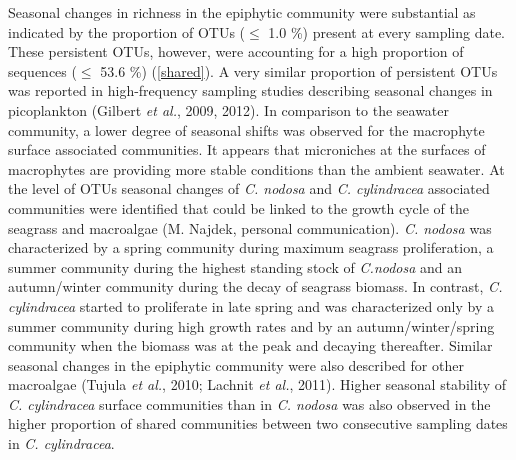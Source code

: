 \documentclass[12pt,]{article}
\begin{document}
Seasonal changes in richness in the epiphytic community were substantial
as indicated by the proportion of OTUs (\(\leq\) 1.0 \si{\percent})
present at every sampling date. These persistent OTUs, however, were
accounting for a high proportion of sequences (\(\leq\) 53.6
\si{\percent}) (\autoref{shared}). A very similar proportion of
persistent OTUs was reported in high-frequency sampling studies
describing seasonal changes in picoplankton (Gilbert \emph{et al.},
2009, 2012). In comparison to the seawater community, a lower degree of
seasonal shifts was observed for the macrophyte surface associated
communities. It appears that microniches at the surfaces of macrophytes
are providing more stable conditions than the ambient seawater. At the
level of OTUs seasonal changes of \emph{C. nodosa} and \emph{C.
cylindracea} associated communities were identified that could be linked
to the growth cycle of the seagrass and macroalgae (M. Najdek, personal
communication). \emph{C. nodosa} was characterized by a spring community
during maximum seagrass proliferation, a summer community during the
highest standing stock of \emph{C.nodosa} and an autumn/winter community
during the decay of seagrass biomass. In contrast, \emph{C. cylindracea}
started to proliferate in late spring and was characterized only by a
summer community during high growth rates and by an autumn/winter/spring
community when the biomass was at the peak and decaying thereafter.
Similar seasonal changes in the epiphytic community were also described
for other macroalgae (Tujula \emph{et al.}, 2010; Lachnit \emph{et al.},
2011). Higher seasonal stability of \emph{C. cylindracea} surface
communities than in \emph{C. nodosa} was also observed in the higher
proportion of shared communities between two consecutive sampling dates
in \emph{C. cylindracea}.
\end{document}
